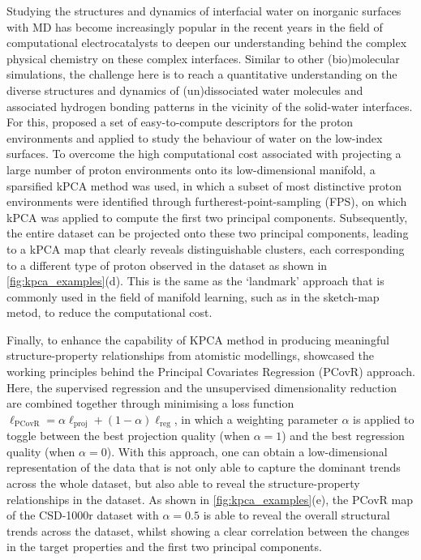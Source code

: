 Studying the structures and dynamics of interfacial water on inorganic surfaces with MD has become increasingly popular in the recent years in the field of computational electrocatalysts to deepen our understanding behind the complex physical chemistry on these complex interfaces.\cite{sakong2018electric,kronberg2020revisiting,andrade2020free,kronberg2021reconciling,qin2023cation,chen2023accelerating,yang2023neural} Similar to other (bio)molecular simulations, the challenge here is to reach a quantitative understanding on the diverse structures and dynamics of (un)dissociated water molecules and associated hydrogen bonding patterns in the vicinity of the solid-water interfaces. For this, \citet{zeng2023mechanistic} proposed a set of easy-to-compute descriptors for the proton environments and applied to study the behaviour of water on the low-index  surfaces. To overcome the high computational cost associated with projecting a large number of proton environments onto its low-dimensional manifold, a sparsified kPCA method was used, in which a subset of most distinctive proton environments were identified through furtherest-point-sampling (FPS), on which kPCA was applied to compute the first two principal components. Subsequently, the entire dataset can be projected onto these two principal components, leading to a kPCA map that clearly reveals distinguishable clusters, each corresponding to a different type of proton observed in the dataset as shown in \cref{fig:kpca_examples}(d). This is the same as the `landmark' approach that is commonly used in the field of manifold learning, such as in the sketch-map metod,\cite{ceriotti2011simplifying} to reduce the computational cost.

Finally, to enhance the capability of KPCA method in producing meaningful structure-property relationships from atomistic modellings, \citet{helfrecht2020structure} showcased the working principles behind the Principal Covariates Regression (PCovR) approach. Here, the supervised regression and the unsupervised dimensionality reduction are combined together through minimising a loss function $\ell_{\mathrm{PCovR}}=\alpha\ell_{\mathrm{proj}}+(1-\alpha)\ell_{\mathrm{reg}}$, in which a weighting parameter $\alpha$ is applied to toggle between the best projection quality (when $\alpha=1$) and the best regression quality (when $\alpha=0$). With this approach, one can obtain a low-dimensional representation of the data that is not only able to capture the dominant trends across the whole dataset, but also able to reveal the structure-property relationships in the dataset. As shown in \cref{fig:kpca_examples}(e), the PCovR map of the CSD-1000r dataset\cite{paruzzo2018chemical} with $\alpha=0.5$ is able to reveal the overall structural trends across the dataset, whilst showing a clear correlation between the changes in the target properties and the first two principal components.

